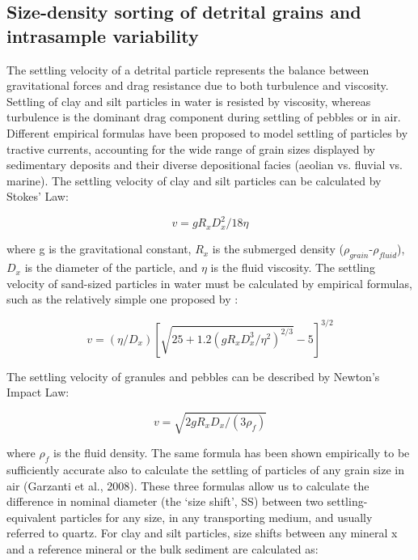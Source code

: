\documentclass{article}
\begin{document}
\subsection{Size-density sorting of detrital grains and 
intrasample variability}
\label{sec:minsorting}

The settling velocity of a detrital particle represents the balance
between gravitational forces and drag resistance due to both
turbulence and viscosity. Settling of clay and silt particles in water
is resisted by viscosity, whereas turbulence is the dominant drag
component during settling of pebbles or in air. Different empirical
formulas have been proposed to model settling of particles by tractive
currents, accounting for the wide range of grain sizes displayed by
sedimentary deposits and their diverse depositional facies (aeolian
vs. fluvial vs. marine).  The settling velocity of clay and silt
particles can be calculated by Stokes' Law:

\begin{equation}
v = g R_x D_x^2 / 18 \eta
\label{eq:stokes}
\end{equation}

where g is the gravitational constant, $R_x$ is the submerged density
($\rho_{grain}$-$\rho_{fluid}$), $D_x$ is the diameter of the
particle, and $\eta$ is the fluid viscosity.  The settling velocity of
sand-sized particles in water must be calculated by empirical
formulas, such as the relatively simple one proposed by
\citep{cheng1997}:

\begin{equation}
v = (\eta/D_x)\left[\sqrt{25 + 1.2 (g R_x D_x^3/\eta^2)^{2/3}} - 
                5\right]^{3/2}
\label{eq:cheng}
\end{equation}

The settling velocity of granules and pebbles can be described by
Newton's Impact Law:

\begin{equation}
v = \sqrt{2 g R_x D_x / (3 \rho_f)}
\label{eq:newton}
\end{equation}

where $\rho_f$ is the fluid density.  The same formula has been shown
empirically to be sufficiently accurate also to calculate the settling
of particles of any grain size in air (Garzanti et al., 2008). These
three formulas allow us to calculate the difference in nominal
diameter (the `size shift', SS) between two settling-equivalent
particles for any size, in any transporting medium, and usually
referred to quartz.  For clay and silt particles, size shifts between
any mineral x and a reference mineral or the bulk sediment are
calculated as:
\end{document}
